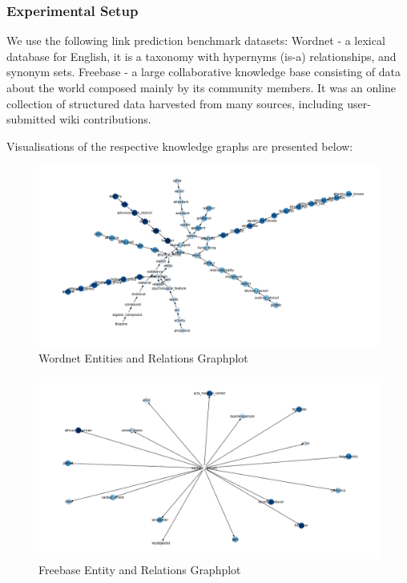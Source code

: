 \subsubsection{Experimental Setup} 

We use the following link prediction benchmark datasets: Wordnet - a lexical database for English, it is a taxonomy with hypernyms (is-a) relationships, and synonym sets. \newline
Freebase - a large collaborative knowledge base consisting of data about the world composed mainly by its community members. It was an online collection of structured data harvested from many sources, including user-submitted wiki contributions. \bigskip

Visualisations of the respective knowledge graphs are presented below:

\begin{figure}[H]
  	\caption{Wordnet Entities and Relations Graphplot}
   	\centering
    	\includegraphics[width=\textwidth]{Wordnet}
\end{figure}

\begin{figure}[H]
  	\caption{Freebase Entity and Relations Graphplot}
   	\centering
    	\includegraphics[width=\textwidth]{Freebase}
\end{figure}

